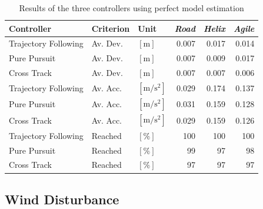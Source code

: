 \begin{table}[h]
\begin{center}
 \begin{tabular}{lll|rrr}
 \hline
 Controller & Criterion & Unit & \textit{Road} & \textit{Helix} & \textit{Agile} \\ \hline \hline
 Trajectory Following & Av. Dev. & $[\si{\meter}]$ & 0.007 & 0.017 & 0.014 \\
 Pure Pursuit         & Av. Dev. & $[\si{\meter}]$ & 0.007 & 0.009 & 0.017 \\
 Cross Track          & Av. Dev. & $[\si{\meter}]$ &  0.007 & 0.007 & 0.006 \\
    
 Trajectory Following & Av. Acc. & $[\si{\meter\per\square\second}]$ & 0.029 & 0.174 & 0.137 \\
 Pure Pursuit         & Av. Acc. & $[\si{\meter\per\square\second}]$ & 0.031 & 0.159 & 0.128 \\
 Cross Track          & Av. Acc. & $[\si{\meter\per\square\second}]$ & 0.029 & 0.159 & 0.126 \\
 
 Trajectory Following & Reached & $[\si{\percent}]$ & 100 & 100 & 100 \\
 Pure Pursuit         & Reached & $[\si{\percent}]$ &  99 &  97 &  98 \\
 Cross Track          & Reached & $[\si{\percent}]$ &  97 &  97 &  97 \\
 \hline
 \end{tabular}
 \caption{Results of the three controllers using perfect model estimation}\vspace{1ex}
 \label{tab:results_perfect_model}
\end{center}
\end{table}


\subsection{Wind Disturbance}
\label{sub:results_wind_disturbance}

